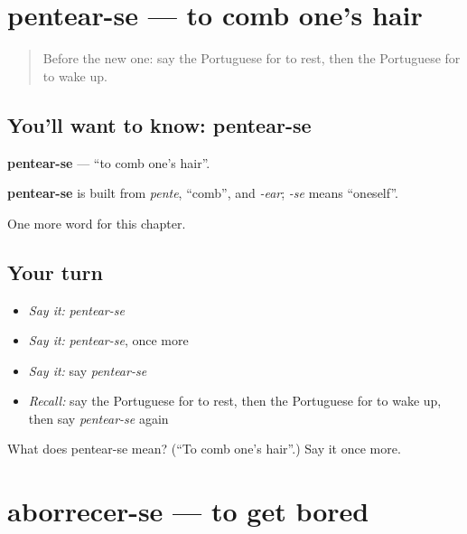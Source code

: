 \section[pentear-se]{pentear-se — to comb one's hair}

\label{lesson:PT-C203-pentear-se}



\begin{quote}
Before the new one: say the Portuguese for to rest, then the Portuguese for to wake up.
\end{quote}

\subsection*{You'll want to know: pentear-se}
\textbf{pentear-se} — \textquotedblleft{}to comb one's hair\textquotedblright{}.

\begin{cousinweb}
\textbf{pentear-se} is built from \emph{pente}, \textquotedblleft{}comb\textquotedblright{}, and \emph{-ear}; \emph{-se} means \textquotedblleft{}oneself\textquotedblright{}.
\end{cousinweb}

\begin{grammarlens}[title={What you've built}]
One more word for this chapter.
\end{grammarlens}

\subsection*{Your turn}
\begin{itemize}
\raggedright
  \item \emph{Say it:} \emph{pentear-se}
  \item \emph{Say it:} \emph{pentear-se}, once more
  \item \emph{Say it:} say \emph{pentear-se}
  \item \emph{Recall:} say the Portuguese for to rest, then the Portuguese for to wake up, then say \emph{pentear-se} again
\end{itemize}

\begin{tcolorbox}[breakable,colback=teal!4,colframe=teal!35!black,title={Before you move on}]
What does pentear-se mean? (\textquotedblleft{}To comb one's hair\textquotedblright{}.) Say it once more.
\end{tcolorbox}
\section[aborrecer-se]{aborrecer-se — to get bored}

